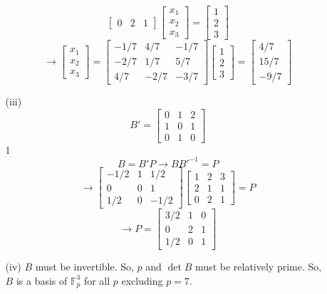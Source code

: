 \documentclass[12pt]{article}
\begin{document}
\begin{itemize}
\begin{itemize}
$$\begin{bmatrix}
0 & 2 & 1
\end{bmatrix}\begin{bmatrix}
x_1 \\
x_2 \\
x_3
\end{bmatrix} = \begin{bmatrix}
1 \\
2 \\
3
\end{bmatrix}$$
$$\rightarrow \begin{bmatrix}
x_1 \\
x_2 \\
x_3
\end{bmatrix} = \begin{bmatrix}
-1/7 & 4/7 & -1/7 \\
-2/7 & 1/7 & 5/7 \\
4/7 & -2/7 & -3/7
\end{bmatrix}\begin{bmatrix}
1 \\
2 \\
3
\end{bmatrix} = \begin{bmatrix}
4/7 \\
15/7 \\
-9/7
\end{bmatrix}$$
\item[(iii)]
$$B' = \begin{bmatrix}
0 & 1 & 2 \\
1 & 0 & 1 \\
0 & 1 & 0
\end{bmatrix}$$1
$$B = B'P \rightarrow BB'^{-1} = P$$
$$\rightarrow \begin{bmatrix}
-1/2 & 1 & 1/2 \\
0 & 0 & 1 \\
1/2 & 0 & -1/2
\end{bmatrix}\begin{bmatrix}
1 & 2 & 3 \\
2 & 1 & 1 \\
0 & 2 & 1
\end{bmatrix} = P$$
$$\rightarrow P = \begin{bmatrix}
3/2 & 1 & 0 \\
0 & 2 & 1 \\
1/2 & 0 & 1
\end{bmatrix}$$
\item[(iv)]
$B$ must be invertible. So, $p$ and $\det B$ must be relatively prime. So, $B$ is a basis of $\mathbb{F}_p^3$ for all $p$ excluding $p = 7$.

\end{itemize}
\end{itemize}
\end{document}
